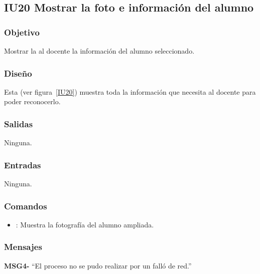 \subsection{IU20 Mostrar la foto e información  del alumno}

\subsubsection{Objetivo}
    Mostrar la al docente la información del alumno seleccionado.

\subsubsection{Diseño}
    Esta  (ver figura~\ref{IU20}) muestra toda la información que necesita al docente para poder reconocerlo.


\subsubsection{Salidas}

    Ninguna.

\subsubsection{Entradas}
    Ninguna.

\subsubsection{Comandos}
\begin{itemize}
    \item {}: Muestra la fotografía del alumno ampliada. 
    
\end{itemize}

\subsubsection{Mensajes}

\begin{Citemize}
    \item {\bf MSG4-} ``El proceso no se pudo realizar por un falló de red.''
\end{Citemize}

